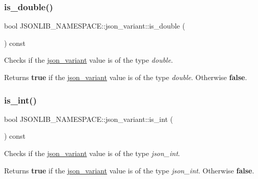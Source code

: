 \subsubsection{\texorpdfstring{is\+\_\+double()}{is\_double()}\hspace{0.1cm}{\footnotesize\ttfamily [2/2]}}
{\footnotesize\ttfamily bool J\+S\+O\+N\+L\+I\+B\+\_\+\+N\+A\+M\+E\+S\+P\+A\+C\+E\+::json\+\_\+variant\+::is\+\_\+double (\begin{DoxyParamCaption}{ }\end{DoxyParamCaption}) const}



Checks if the \hyperlink{classJSONLIB__NAMESPACE_1_1json__variant}{json\+\_\+variant} value is of the type {\itshape double}. 

\begin{DoxyReturn}{Returns}
{\bfseries true} if the \hyperlink{classJSONLIB__NAMESPACE_1_1json__variant}{json\+\_\+variant} value is of the type {\itshape double}. Otherwise {\bfseries false}. 
\end{DoxyReturn}
\mbox{\label{classJSONLIB__NAMESPACE_1_1json__variant_a2d6f7d2f92f5c3bfaf9c548a783a97fb}} 
\subsubsection{\texorpdfstring{is\+\_\+int()}{is\_int()}\hspace{0.1cm}{\footnotesize\ttfamily [1/2]}}
{\footnotesize\ttfamily bool J\+S\+O\+N\+L\+I\+B\+\_\+\+N\+A\+M\+E\+S\+P\+A\+C\+E\+::json\+\_\+variant\+::is\+\_\+int (\begin{DoxyParamCaption}{ }\end{DoxyParamCaption}) const}



Checks if the \hyperlink{classJSONLIB__NAMESPACE_1_1json__variant}{json\+\_\+variant} value is of the type {\itshape json\+\_\+int}. 

\begin{DoxyReturn}{Returns}
{\bfseries true} if the \hyperlink{classJSONLIB__NAMESPACE_1_1json__variant}{json\+\_\+variant} value is of the type {\itshape json\+\_\+int}. Otherwise {\bfseries false}. 
\end{DoxyReturn}
\mbox{\label{classJSONLIB__NAMESPACE_1_1json__variant_a2d6f7d2f92f5c3bfaf9c548a783a97fb}} 

